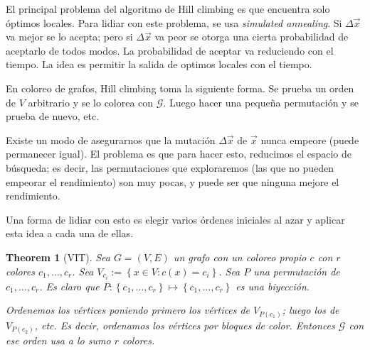 \documentclass[a4paper]{article}
\newtheorem{theorem}{Theorem}
\newtheorem{theorem}{Theorem}
\begin{document}
El principal problema del algoritmo de Hill climbing es que encuentra solo
óptimos locales. Para lidiar con este problema, se usa \textit{simulated
annealing}. Si $\Delta \vec{x}$ va mejor se lo acepta; pero si $\Delta \vec{x}$
va peor se otorga una cierta probabilidad de aceptarlo de todos modos. La
probabilidad de aceptar va reduciendo con el tiempo. La idea es permitir la
salida de optimos locales con el tiempo.

En coloreo de grafos, Hill climbing toma la siguiente forma. Se prueba un orden
de $V$ arbitrario y se lo colorea con $\mathscr{G}$. Luego hacer una pequeña
permutación y se prueba de nuevo, etc. 

Existe un modo de asegurarnos que la mutación $\Delta \vec{x}$ de $\vec{x}$
nunca empeore (puede permanecer igual). El problema es que para hacer esto,
reducimos el espacio de búsqueda; es decir, las permutaciones que
exploraremos (las que no pueden empeorar el rendimiento) son muy pocas, y puede
ser que ninguna mejore el rendimiento. 

Una forma de lidiar con esto es elegir varios órdenes iniciales al azar y
aplicar esta idea a cada una de ellas.

\begin{theorem}[VIT]

    Sea $G = (V, E) $ un grafo con un coloreo propio $c$ con $r$ colores $c_1,
    \ldots, c_r$. Sea $V_{c_i} := \left\{ x \in V : c(x) = c_i \right\} $. Sea $P$
    una permutación de $c_1, \ldots, c_r$. Es claro que $P : \left\{ c_1, \ldots, c_r
    \right\} \mapsto \left\{ c_1, \ldots, c_r \right\} $ es una biyección.


    Ordenemos los vértices poniendo primero los vértices de $V_{P(c_1)}$; luego
    los de $V_{P(c_2)}$, etc. Es decir, ordenamos los vértices por bloques de
    color. Entonces $\mathscr{G}$ con ese orden usa a lo sumo $r$ colores.
    
\end{theorem}
\end{document}
